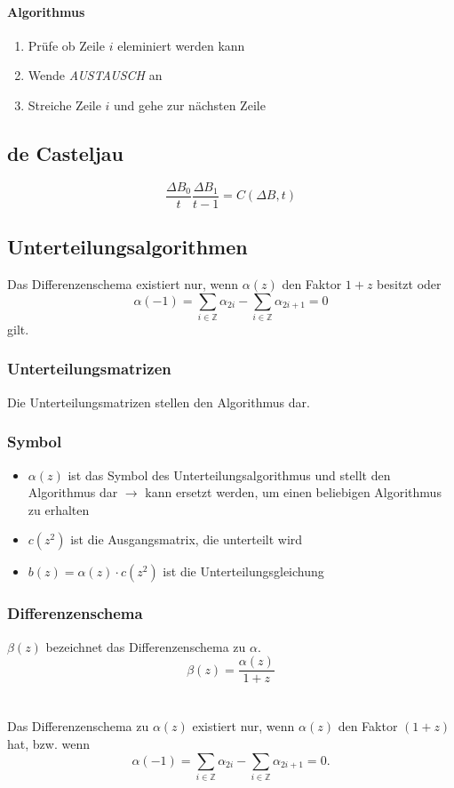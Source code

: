 \paragraph{Algorithmus}
\begin{enumerate}
	\item Prüfe ob Zeile \(i\) eleminiert werden kann
	\item Wende \textit{AUSTAUSCH} an
	\item Streiche Zeile \(i\) und gehe zur nächsten Zeile
\end{enumerate}



\subsection{de Casteljau}
\[\frac{\Delta B_0}{t} \frac{\Delta B_1}{t-1} = C(\Delta B,t)\]


\subsection{Unterteilungsalgorithmen}
Das Differenzenschema existiert nur, wenn \(\alpha(z)\) den Faktor \(1+z\) besitzt oder
\[\alpha(-1) = \sum_{i \in \mathbb{Z}} \alpha_{2i} - \sum_{i \in \mathbb{Z}}\alpha_{2i + 1} = 0\]
gilt.

\subsubsection{Unterteilungsmatrizen}
Die Unterteilungsmatrizen stellen den Algorithmus dar.

\subsubsection{Symbol}
\begin{itemize}
	\item \(\alpha (z) \) ist das Symbol des Unterteilungsalgorithmus und stellt den Algorithmus dar \(\rightarrow\) kann ersetzt werden, um einen beliebigen Algorithmus zu erhalten
	\item \(c(z^2)\) ist die Ausgangsmatrix, die unterteilt wird
	\item \(b(z) = \alpha(z) \cdot c(z^2)\) ist die Unterteilungsgleichung 
\end{itemize}


\subsubsection{Differenzenschema}
\(\beta(z)\) bezeichnet das Differenzenschema zu \(\alpha\).
\[\beta(z) = \frac{\alpha(z)}{1+z}\]
\\\\
Das Differenzenschema zu \(\alpha(z)\) existiert nur, wenn \(\alpha(z)\) den Faktor \((1+z)\) hat, bzw. wenn
\[\alpha(-1) = \sum_{i \in \mathbb{Z}}\alpha_{2i} - \sum_{i \in \mathbb{Z}}\alpha_{2i+1} = 0.\]

